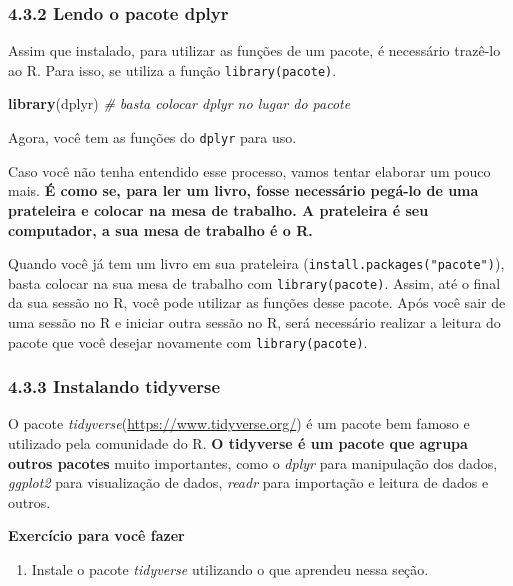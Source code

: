 \documentclass[
]{article}
\newenvironment{Shaded}{\begin{snugshade}}{\end{snugshade}}
\newcommand{\CommentTok}[1]{\textcolor[rgb]{0.56,0.35,0.01}{\textit{#1}}}
\newcommand{\KeywordTok}[1]{\textcolor[rgb]{0.13,0.29,0.53}{\textbf{#1}}}
\newcommand{\NormalTok}[1]{#1}
\providecommand{\tightlist}{%
  \setlength{\itemsep}{0pt}\setlength{\parskip}{0pt}}
\begin{document}
\hypertarget{lendo-o-pacote-dplyr}{%
\subsubsection{4.3.2 Lendo o pacote dplyr}\label{lendo-o-pacote-dplyr}}

Assim que instalado, para utilizar as funções de um pacote, é necessário
trazê-lo ao R. Para isso, se utiliza a função \texttt{library(pacote)}.

\begin{Shaded}
\begin{Highlighting}[]
\KeywordTok{library}\NormalTok{(dplyr) }\CommentTok{# basta colocar dplyr no lugar do pacote}
\end{Highlighting}
\end{Shaded}

Agora, você tem as funções do \texttt{dplyr} para uso.

Caso você não tenha entendido esse processo, vamos tentar elaborar um
pouco mais. \textbf{É como se, para ler um livro, fosse necessário
pegá-lo de uma prateleira e colocar na mesa de trabalho. A prateleira é
seu computador, a sua mesa de trabalho é o R.}

Quando você já tem um livro em sua prateleira
(\texttt{install.packages("pacote")}), basta colocar na sua mesa de
trabalho com \texttt{library(pacote)}. Assim, até o final da sua sessão
no R, você pode utilizar as funções desse pacote. Após você sair de uma
sessão no R e iniciar outra sessão no R, será necessário realizar a
leitura do pacote que você desejar novamente com
\texttt{library(pacote)}.

\hypertarget{instalando-tidyverse}{%
\subsubsection{4.3.3 Instalando tidyverse}\label{instalando-tidyverse}}

O pacote \emph{tidyverse}(\url{https://www.tidyverse.org/}) é um pacote
bem famoso e utilizado pela comunidade do R. \textbf{O tidyverse é um
pacote que agrupa outros pacotes} muito importantes, como o \emph{dplyr}
para manipulação dos dados, \emph{ggplot2} para visualização de dados,
\emph{readr} para importação e leitura de dados e outros.

\textbf{Exercício para você fazer}

\begin{enumerate}
\def\labelenumi{\arabic{enumi}.}
\tightlist
\item
  Instale o pacote \emph{tidyverse} utilizando o que aprendeu nessa
  seção.
\end{enumerate}
\end{document}
